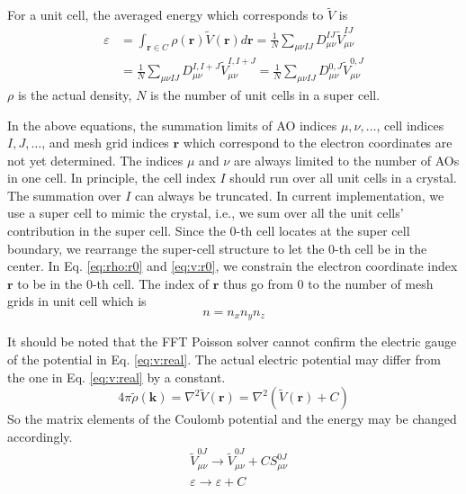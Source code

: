 \documentclass{article}
\begin{document}
For a unit cell, the averaged energy which corresponds to $\tilde{V}$ is
\begin{align}
  \varepsilon &= \int_{\mathbf{r}\in C} \rho(\mathbf{r})\tilde{V}(\mathbf{r}) d\mathbf{r}
  = \frac{1}{N}\sum_{\mu\nu IJ} D_{\mu\nu}^{IJ} \tilde{V}_{\mu\nu}^{IJ}
  \\
  &=\frac{1}{N}\sum_{\mu\nu IJ} D_{\mu\nu}^{I,I+J} \tilde{V}_{\mu\nu}^{I,I+J}
  = \frac{1}{N}\sum_{\mu\nu IJ} D_{\mu\nu}^{0,J} \tilde{V}_{\mu\nu}^{0,J}
  \label{}
\end{align}
$\rho$ is the actual density, $N$ is the number of unit cells in a super cell.

In the above equations, the summation limits of AO indices $\mu,\nu,\dots$,
cell indices $I,J,\dots$, and mesh grid indices $\mathbf{r}$ which correspond
to the electron coordinates are not yet determined.
The indices $\mu$ and $\nu$ are always limited to the number of AOs in one cell.
In principle, the cell index $I$ should run over all unit cells in a
crystal.  The summation over $I$ can always be truncated.
In current implementation, we use a super cell to mimic the crystal,
i.e., we sum over all the unit cells' contribution in the super cell.
Since the 0-th cell locates at the super cell boundary, we rearrange the
super-cell structure to let the 0-th cell be in the center.
In Eq. \eqref{eq:rho:r0} and \eqref{eq:v:r0}, we constrain the electron
coordinate index $\mathbf{r}$ to be in the $0$-th cell.
The index of $\mathbf{r}$ thus go from 0 to the number of mesh grids in unit
cell which is
\begin{equation}
  n = n_x n_y n_z
  \label{}
\end{equation}

It should be noted that the FFT Poisson solver cannot confirm the electric
gauge of the potential in Eq. \eqref{eq:v:real}.
The actual electric potential may differ from the one in Eq.
\eqref{eq:v:real} by a constant.
\begin{equation}
  4\pi \tilde{\rho}(\mathbf{k}) = \nabla^2\tilde{V}(\mathbf{r})
  = \nabla^2(\tilde{V}(\mathbf{r}) + C)
  \label{}
\end{equation}
So the matrix elements of the Coulomb potential and the energy may be changed
accordingly.
\begin{align}
  &\tilde{V}_{\mu\nu}^{0J} \rightarrow \tilde{V}_{\mu\nu}^{0J} + CS_{\mu\nu}^{0J} \\
  &\varepsilon \rightarrow \varepsilon + C
  \label{}
\end{align}
\end{document}
